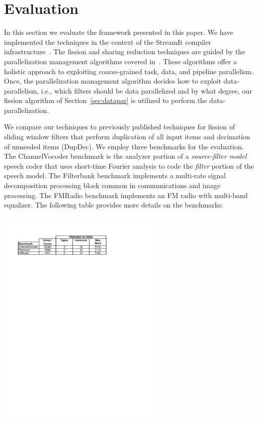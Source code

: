 \section{Evaluation}
\label{sec:eval}

In this section we evaluate the framework presented in this paper.  We
have implemented the techniques in the context of the StreamIt
compiler infrastructure~\cite{gordon-asplos06}.  The fission and
sharing reduction techniques are guided by the parallelization
management algorithms covered in~\cite{gordon-asplos06}.  These
algorithms offer a holistic approach to exploiting coarse-grained
task, data, and pipeline parallelism.   Once, the parallelization management
algorithm decides how to exploit data-parallelism, i.e., which
filters should be data parallelized and by what degree, our fission
algorithm of Section~\ref{sec:datapar} is utilized to perform the
data-parallelization. 

We compare our techniques to previously published techniques for
fission of sliding window filters that perform duplication of all
input items and decimation of unneeded items (DupDec).  We employ
three benchmarks for the evaluation.  The ChannelVocoder benchmark is
the analyzer portion of a {\it source-filter model} speech coder that
uses short-time Fourier analysis to code the {\it filter} portion of
the speech model.  The Filterbank benchmark implements a multi-rate
signal decomposition processing block common in communications and
image processing.  The FMRadio benchmark implements an FM radio with
multi-band equalizer.  The following table provides more details on
the benchmarks:


{\centering
\includegraphics[width=3.3in]{figures/bench-char.pdf}}


